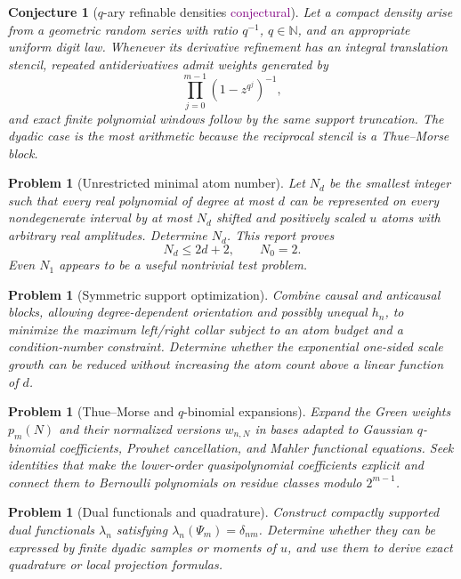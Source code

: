 \documentclass[11pt]{article}
\newtheorem{conjecture}[theorem]{Conjecture}
\newtheorem{problem}[theorem]{Problem}
\theoremstyle{definition}
\theoremstyle{remark}
\newcommand{\N}{\mathbb{N}}
\newcommand{\1}{\mathbf{1}}
\newcommand{\Conjectural}{\textcolor{Purple}{\textsf{conjectural}}}
\begin{document}
\begin{conjecture}[$q$-ary refinable densities \Conjectural]
Let a compact density arise from a geometric random series with ratio $q^{-1}$,
$q\in\N$, and an appropriate uniform digit law.  Whenever its derivative
refinement has an integral translation stencil, repeated antiderivatives admit
weights generated by
\[
 \prod_{j=0}^{m-1}(1-z^{q^j})^{-1},
\]
and exact finite polynomial windows follow by the same support truncation.
The dyadic case is the most arithmetic because the reciprocal stencil is a
Thue--Morse block.
\end{conjecture}

\begin{problem}[Unrestricted minimal atom number]
Let $N_d$ be the smallest integer such that every real polynomial of degree at
most $d$ can be represented on every nondegenerate interval by at most $N_d$
shifted and positively scaled $u$ atoms with arbitrary real amplitudes.
Determine $N_d$.  This report proves
\[
 N_d\leq2d+2,
 \qquad N_0=2.
\]
Even $N_1$ appears to be a useful nontrivial test problem.
\end{problem}

\begin{problem}[Symmetric support optimization]
Combine causal and anticausal blocks, allowing degree-dependent orientation and
possibly unequal $h_n$, to minimize the maximum left/right collar subject to an
atom budget and a condition-number constraint.  Determine whether the
exponential one-sided scale growth can be reduced without increasing the atom
count above a linear function of $d$.
\end{problem}

\begin{problem}[Thue--Morse and $q$-binomial expansions]
Expand the Green weights $p_m(N)$ and their normalized versions $w_{n,N}$ in
bases adapted to Gaussian $q$-binomial coefficients, Prouhet cancellation, and
Mahler functional equations.  Seek identities that make the lower-order
quasipolynomial coefficients explicit and connect them to Bernoulli polynomials
on residue classes modulo $2^{m-1}$.
\end{problem}

\begin{problem}[Dual functionals and quadrature]
Construct compactly supported dual functionals $\lambda_n$ satisfying
$\lambda_n(\Psi_m)=\delta_{nm}$.  Determine whether they can be expressed by
finite dyadic samples or moments of $u$, and use them to derive exact quadrature
or local projection formulas.
\end{problem}
\end{document}
